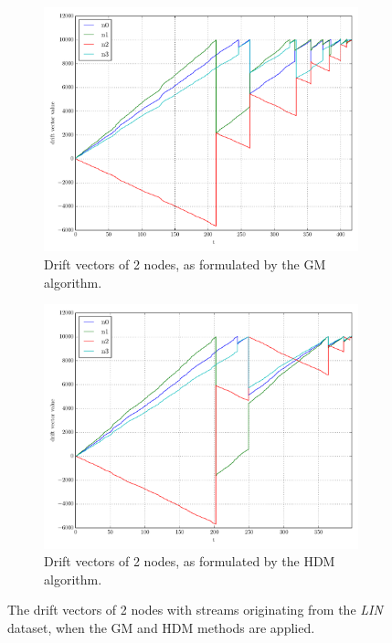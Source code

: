 \begin{figure}[!h]
\begin{subfigure}{0.49\textwidth}
  \includegraphics[width=\linewidth]{img/main_classic_drifts_linear4N.pdf}
  \caption{Drift vectors of 2 nodes, as formulated by the GM algorithm.}
\end{subfigure}\hfill
\begin{subfigure}{0.49\textwidth}
  \includegraphics[width=\linewidth]{img/main_heuristic_drifts_linear4N.pdf}
  \caption{Drift vectors of 2 nodes, as formulated by the HDM algorithm.}
\end{subfigure}\hfill
\vspace{0.5cm}
\caption{The drift vectors of 2 nodes with streams originating from the \emph{LIN} dataset, when the GM and HDM methods are applied.} \label{fig:mainComp-drifts}
\end{figure}

